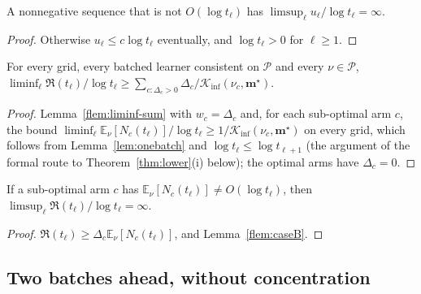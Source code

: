 \documentclass[11pt]{article}
\newcommand{\E}{\mathbb{E}}
\newcommand{\Kinf}{\mathcal K_{\inf}}
\newcommand{\cP}{\mathcal P}
\begin{document}
\begin{lemma}\label{flem:caseB}
A nonnegative sequence that is not $O(\log t_\ell)$ has $\limsup_\ell u_\ell/\log t_\ell=\infty$.
\end{lemma}

\begin{proof}
Otherwise $u_\ell\le c\log t_\ell$ eventually, and $\log t_\ell>0$ for $\ell\ge1$.
\end{proof}

\begin{lemma}\label{flem:regret-one}
For every grid, every batched learner consistent on $\cP$ and every $\nu\in\cP$,
$\liminf_\ell\mathfrak R(t_\ell)/\log t_\ell\ge\sum_{c:\Delta_c>0}\Delta_c/\Kinf(\nu_c,\mathbf m^\star)$.
\end{lemma}

\begin{proof}
Lemma~\ref{flem:liminf-sum} with $w_c=\Delta_c$ and, for each sub-optimal arm $c$, the bound
$\liminf_\ell\E_\nu[N_c(t_\ell)]/\log t_\ell\ge1/\Kinf(\nu_c,\mathbf m^\star)$ on every grid, which
follows from Lemma~\ref{lem:onebatch} and $\log t_\ell\le\log t_{\ell+1}$ (the argument of the
formal route to Theorem~\ref{thm:lower}(i) below); the optimal arms have $\Delta_c=0$.
\end{proof}

\begin{lemma}\label{flem:regret-caseB}
If a sub-optimal arm $c$ has $\E_\nu[N_c(t_\ell)]\ne O(\log t_\ell)$, then
$\limsup_\ell\mathfrak R(t_\ell)/\log t_\ell=\infty$.
\end{lemma}

\begin{proof}
$\mathfrak R(t_\ell)\ge\Delta_c\E_\nu[N_c(t_\ell)]$, and Lemma~\ref{flem:caseB}.
\end{proof}

\subsection{Two batches ahead, without concentration}
\end{document}
